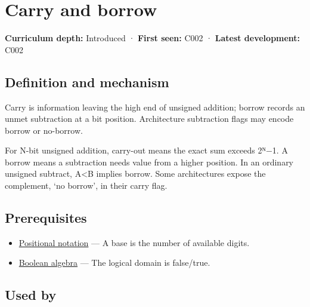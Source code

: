 \hypertarget{appendix-d52d5f78ffd1}{}\label{referencestart:appendix-d52d5f78ffd1}
\section{Carry and borrow}\label{appendix-d52d5f78ffd1-carry-and-borrow}

\hypertarget{appendix-d52d5f78ffd1-carry-and-borrow}{}

\textbf{Curriculum depth:} Introduced · \textbf{First seen:} C002 · \textbf{Latest development:} C002

\begin{allmightroledefinition}

\subsection{Definition and mechanism}\label{appendix-d52d5f78ffd1-definition-and-mechanism}

\hypertarget{appendix-d52d5f78ffd1-definition-and-mechanism}{}

Carry is information leaving the high end of unsigned addition; borrow records an unmet subtraction at a bit position. Architecture subtraction flags may encode borrow or no-borrow.

\end{allmightroledefinition}

For N-bit unsigned addition, carry-out means the exact sum exceeds 2ᴺ−1. A borrow means a subtraction needs value from a higher position. In an ordinary unsigned subtract, A\textless B implies borrow. Some architectures expose the complement, `no borrow', in their carry flag.

\subsection{Prerequisites}\label{appendix-d52d5f78ffd1-prerequisites}

\hypertarget{appendix-d52d5f78ffd1-prerequisites}{}

\begin{itemize}
\tightlist
\item
  \hyperref[appendix-83c3f28f7bda]{Positional notation} --- A base is the number of available digits.
\item
  \hyperref[appendix-24475e1596a8]{Boolean algebra} --- The logical domain is false/true.
\end{itemize}

\subsection{Used by}\label{appendix-d52d5f78ffd1-used-by}

